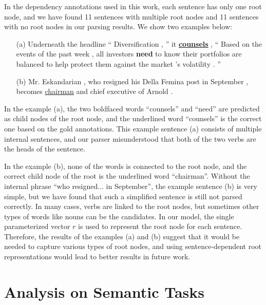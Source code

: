 \documentclass[11pt,a4paper]{article}
\begin{document}
In the dependency annotations used in this work, each sentence has only one root node, and we have found 11 sentences with multiple root nodes and 11 sentences with no root nodes in our parsing results.
We show two examples below:
\begin{itemize}
\item[(a)] Underneath the headline `` Diversification , '' it \underline{{\bf counsels}} , `` Based on the events of the past week , all investors {\bf need} to know their portfolios are balanced to help protect them against the market 's volatility . ''
\item[(b)] Mr. Eskandarian , who resigned his Della Femina post in September , becomes \underline{chairman} and chief executive of Arnold .
\end{itemize}
In the example (a), the two boldfaced words ``counsels'' and ``need'' are predicted as child nodes of the root node, and the underlined word ``counsels'' is the correct one based on the gold annotations.
This example sentence (a) consists of multiple internal sentences, and our parser misunderstood that both of the two verbs are the heads of the sentence.

In the example (b), none of the words is connected to the root node, and the correct child node of the root is the underlined word ``chairman''.
Without the internal phrase ``who resigned... in September'', the example sentence (b) is very simple, but we have found that such a simplified sentence is still not parsed correctly.
In many cases, verbs are linked to the root nodes, but sometimes other types of words like nouns can be the candidates.
In our model, the single parameterized vector $r$ is used to represent the root node for each sentence.
Therefore, the results of the examples (a) and (b) suggest that it would be needed to capture various types of root nodes, and using sentence-dependent root representations would lead to better results in future work.

\section{Analysis on Semantic Tasks}
\label{sec:sem_analysis}
\end{document}
